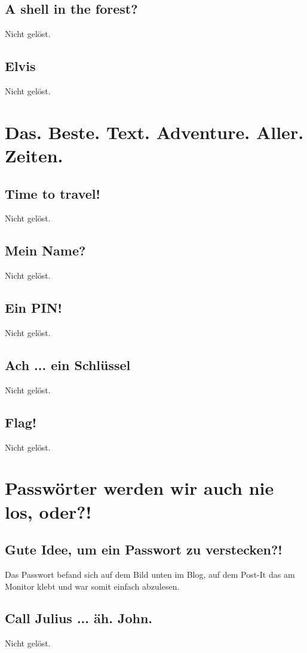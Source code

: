 \documentclass[12pt, a4paper, titlepage, oneside]{scrartcl}
\begin{document}
	\subsection{A shell in the forest?}
	Nicht gelöst.

	\subsection{Elvis}
	Nicht gelöst.

	\section{Das. Beste. Text. Adventure. Aller. Zeiten.}

	\subsection{Time to travel!}
	Nicht gelöst.

	\subsection{Mein Name?}
	Nicht gelöst.

	\subsection{Ein PIN!}
	Nicht gelöst.

	\subsection{Ach ... ein Schl\"ussel}
	Nicht gelöst.

	\subsection{Flag!}
	Nicht gelöst.

	\section{Passwörter werden wir auch nie los, oder?!}

	\subsection{Gute Idee, um ein Passwort zu verstecken?!}
	Das Passwort befand sich auf dem Bild unten im Blog, auf dem Post-It das am Monitor klebt und war somit einfach abzulesen.

	\subsection{Call Julius ... äh. John.}
	Nicht gelöst.
\end{document}
